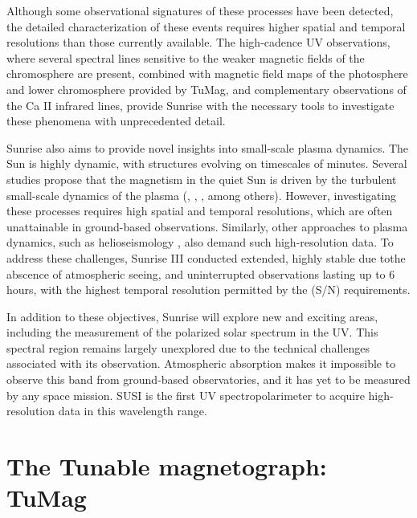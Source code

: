 Although some observational signatures of these processes have been detected, the detailed characterization of these events requires higher spatial and temporal resolutions than those currently available. The high-cadence UV observations, where several spectral lines sensitive to the weaker magnetic fields of the chromosphere are present, combined with magnetic field maps of the photosphere and lower chromosphere provided by TuMag, and complementary observations of the Ca II infrared lines, provide Sunrise with the necessary tools to investigate these phenomena with unprecedented detail.

Sunrise also aims to provide novel insights into small-scale plasma dynamics. The Sun is highly dynamic, with structures evolving on timescales of minutes. Several studies propose that the magnetism in the quiet Sun is driven by the turbulent small-scale dynamics of the plasma (\cite{small_scale_dynamo}, \cite{small_scale_dynamo_2}, \cite{small_scale_dynamo_3}, among others). However, investigating these processes requires high spatial and temporal resolutions, which are often unattainable in ground-based observations. Similarly, other approaches to plasma dynamics, such as helioseismology \citep{helioseismology}, also demand such high-resolution data. To address these challenges, Sunrise III conducted extended, highly stable due tothe abscence of atmospheric seeing, and uninterrupted observations lasting up to 6 hours, with the highest temporal resolution permitted by the (S/N) requirements.

In addition to these objectives, Sunrise will explore new and exciting areas, including the measurement of the polarized solar spectrum in the UV. This spectral region remains largely unexplored due to the technical challenges associated with its observation. Atmospheric absorption makes it impossible to observe this band from ground-based observatories, and it has yet to be measured by any space mission. SUSI is the first UV spectropolarimeter to acquire high-resolution data in this wavelength range.

\section{The Tunable magnetograph: TuMag}

